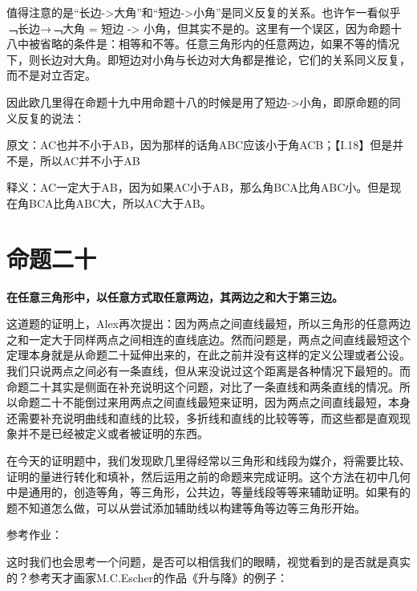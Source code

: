 \documentclass[
]{book}
\begin{document}
值得注意的是``长边-\textgreater 大角''和``短边-\textgreater 小角''是同义反复的关系。也许乍一看似乎﹁长边→﹁大角 = 短边 -\textgreater{} 小角，但其实不是的。这里有一个误区，因为命题十八中被省略的条件是：相等和不等。任意三角形内的任意两边，如果不等的情况下，则长边对大角。即短边对小角与长边对大角都是推论，它们的关系同义反复，而不是对立否定。

因此欧几里得在命题十九中用命题十八的时候是用了短边-\textgreater 小角，即原命题的同义反复的说法：

原文：AC也并不小于AB，因为那样的话角ABC应该小于角ACB；【I.18】但是并不是，所以AC并不小于AB

释义：AC一定大于AB，因为如果AC小于AB，那么角BCA比角ABC小。但是现在角BCA比角ABC大，所以AC大于AB。

\hypertarget{ux547dux9898ux4e8cux5341}{%
\section{命题二十}\label{ux547dux9898ux4e8cux5341}}

\textbf{在任意三角形中，以任意方式取任意两边，其两边之和大于第三边。}

这道题的证明上，Alex再次提出：因为两点之间直线最短，所以三角形的任意两边之和一定大于同样两点之间相连的直线底边。然而问题是，两点之间直线最短这个定理本身就是从命题二十延伸出来的，在此之前并没有这样的定义公理或者公设。我们只说两点之间必有一条直线，但从来没说过这个距离是各种情况下最短的。而命题二十其实是侧面在补充说明这个问题，对比了一条直线和两条直线的情况。所以命题二十不能倒过来用两点之间直线最短来证明，因为两点之间直线最短，本身还需要补充说明曲线和直线的比较，多折线和直线的比较等等，而这些都是直观现象并不是已经被定义或者被证明的东西。

在今天的证明题中，我们发现欧几里得经常以三角形和线段为媒介，将需要比较、证明的量进行转化和填补，然后运用之前的命题来完成证明。这个方法在初中几何中是通用的，创造等角，等三角形，公共边，等量线段等等来辅助证明。如果有的题不知道怎么做，可以从尝试添加辅助线以构建等角等边等三角形开始。

参考作业：

这时我们也会思考一个问题，是否可以相信我们的眼睛，视觉看到的是否就是真实的？参考天才画家M.C.Escher的作品《升与降》的例子：
\end{document}
